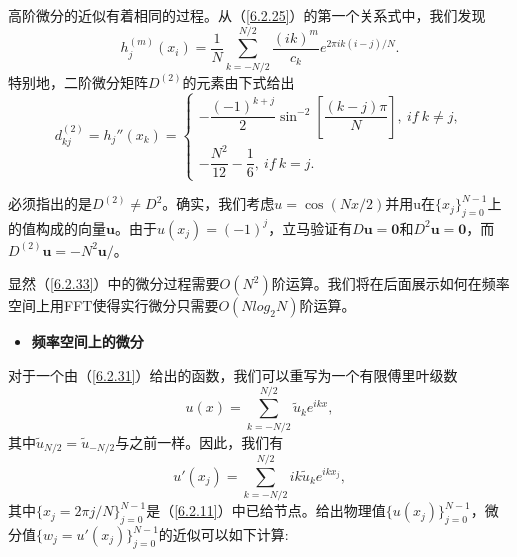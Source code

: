     高阶微分的近似有着相同的过程。从（\ref{6.2.25}）的第一个关系式中，我们发现    
\begin{equation}
    h_j^{(m)}(x_i) = \dfrac{1}{N} \sum_{k=-N/2}^{N/2} \dfrac{(ik)^m}{c_k}e^{2\pi ik(i-j)/N}.
    \label{6.2.36}
\end{equation}        
    特别地，二阶微分矩阵$D^{(2)}$的元素由下式给出   
\begin{equation}
    d_{kj}^{(2)} = h_j''(x_k) = 
    \left\{
        \begin{array}{l}                
        -\dfrac{(-1)^{k+j}}{2} \sin^{-2}\left[\dfrac{(k-j)\pi}{N}\right], \  if \ k\neq j,  \\
        -\dfrac{N^2}{12}-\dfrac{1}{6}, \  if \  k = j.
        \end{array}
    \right.
    \label{6.2.37}
\end{equation}    

    必须指出的是$D^{(2)}\neq D^2$。确实，我们考虑$u = \cos(Nx/2)$并用u在$\{ x_j \}_{j = 0}^{N-1}$上的值构成的向量$\textbf{u}$。由于$u(x_j) = (-1)^j$，立马验证有$D\textbf{u} = \textbf{0}$和$D^2\textbf{u} = \textbf{0}$，而$D^{(2)}\textbf{u} = -N^2\textbf{u}/$。
    
    显然（\ref{6.2.33}）中的微分过程需要$O(N^2)$阶运算。我们将在后面展示如何在频率空间上用FFT使得实行微分只需要$O(Nlog_2N)$阶运算。
    
\begin{itemize}
    \item    \textbf{频率空间上的微分}
\end{itemize}
    对于一个由（\ref{6.2.31}）给出的函数，我们可以重写为一个有限傅里叶级数       
\begin{equation}
    u(x) = \sum_{k = -N/2}^{N/2} \widetilde{u}_k e^{ikx},
    \label{6.2.38}
\end{equation}        
    其中$\widetilde{u}_{N/2} = \widetilde{u}_{-N/2}$与之前一样。因此，我们有    
\begin{equation}
    u'(x_j) = \sum_{k = -N/2}^{N/2} ik\widetilde{u}_k e^{ikx_j},
    \label{6.2.39}
\end{equation}       
    其中$\{ x_j = 2\pi j/N \}_{j = 0}^{N-1}$是（\ref{6.2.11}）中已给节点。给出物理值$\{ u(x_j) \}_{j = 0}^{N-1}$，微分值$\{ w_j = u'(x_j) \}_{j = 0}^{N-1}$的近似可以如下计算:    

